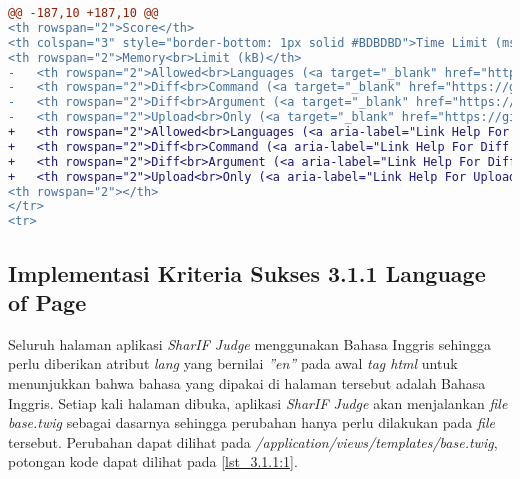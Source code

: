 \begin{itemize}
\begin{lstlisting}[language=diff, caption=Perubahan pada \textit{file} \textit{add\_assignment.twig}, label=lst_2.4.4:3, basicstyle=\ttfamily, frame=single,
columns=fullflexible, keepspaces=true, breaklines=true]
@@ -187,10 +187,10 @@
<th rowspan="2">Score</th>
<th colspan="3" style="border-bottom: 1px solid #BDBDBD">Time Limit (ms)</th>
<th rowspan="2">Memory<br>Limit (kB)</th>
- 	<th rowspan="2">Allowed<br>Languages (<a target="_blank" href="https://github.com/ifunpar/Sharif-Judge/blob/docs/v1.4/add_assignment.md#allowed-languages">?</a>)</th>
- 	<th rowspan="2">Diff<br>Command (<a target="_blank" href="https://github.com/ifunpar/Sharif-Judge/blob/docs/v1.4/add_assignment.md#diff-command">?</a>)</th>
- 	<th rowspan="2">Diff<br>Argument (<a target="_blank" href="https://github.com/ifunpar/Sharif-Judge/blob/docs/v1.4/add_assignment.md#diff-arguments">?</a>)</th>
- 	<th rowspan="2">Upload<br>Only (<a target="_blank" href="https://github.com/ifunpar/Sharif-Judge/blob/docs/v1.4/add_assignment.md#upload-only">?</a>)</th>
+ 	<th rowspan="2">Allowed<br>Languages (<a aria-label="Link Help For Languages" target="_blank" href="https://github.com/ifunpar/Sharif-Judge/blob/docs/v1.4/add_assignment.md#allowed-languages">?</a>)</th>
+ 	<th rowspan="2">Diff<br>Command (<a aria-label="Link Help For Diff Command" target="_blank" href="https://github.com/ifunpar/Sharif-Judge/blob/docs/v1.4/add_assignment.md#diff-command">?</a>)</th>
+ 	<th rowspan="2">Diff<br>Argument (<a aria-label="Link Help For Diff Argument" target="_blank" href="https://github.com/ifunpar/Sharif-Judge/blob/docs/v1.4/add_assignment.md#diff-arguments">?</a>)</th>
+ 	<th rowspan="2">Upload<br>Only (<a aria-label="Link Help For Upload Only" target="_blank" href="https://github.com/ifunpar/Sharif-Judge/blob/docs/v1.4/add_assignment.md#upload-only">?</a>)</th>
<th rowspan="2"></th>
</tr>
<tr>
\end{lstlisting}

\end{itemize}

\subsection{Implementasi Kriteria Sukses 3.1.1 Language of Page}
\label{subsec:implementasi_A_3.1.1}

Seluruh halaman aplikasi \textit{SharIF Judge} menggunakan Bahasa Inggris sehingga perlu diberikan atribut \textit{lang} yang bernilai \textit{''en''} pada awal \textit{tag html} untuk menunjukkan bahwa bahasa yang dipakai di halaman tersebut adalah Bahasa Inggris. Setiap kali halaman dibuka, aplikasi \textit{SharIF Judge} akan menjalankan \textit{file} \textit{base.twig} sebagai dasarnya sehingga perubahan hanya perlu dilakukan pada \textit{file} tersebut. Perubahan dapat dilihat pada \textit{/application/views/templates/base.twig}, potongan kode dapat dilihat pada \ref{lst_3.1.1:1}.

